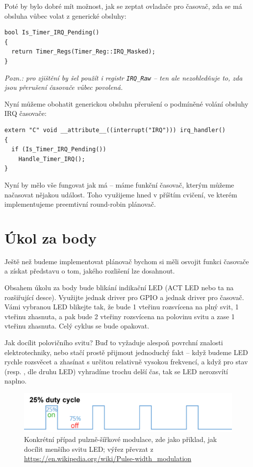 \documentclass{article}
\begin{document}
Poté by bylo dobré mít možnost, jak se zeptat ovladače pro časovač, zda se má obsluha vůbec volat z generické obsluhy:

\begin{lstlisting}
bool Is_Timer_IRQ_Pending()
{
  return Timer_Regs(Timer_Reg::IRQ_Masked);
}
\end{lstlisting}
\emph{Pozn.: pro zjištění by šel použít i registr \texttt{IRQ\_Raw} -- ten ale nezohledňuje to, zda jsou přerušení časovače vůbec povolená.}

Nyní můžeme obohatit generickou obsluhu přerušení o podmíněné volání obsluhy IRQ časovače:
\begin{lstlisting}
extern "C" void __attribute__((interrupt("IRQ"))) irq_handler()
{
  if (Is_Timer_IRQ_Pending())
    Handle_Timer_IRQ();
}
\end{lstlisting}

Nyní by mělo vše fungovat jak má -- máme funkční časovač, kterým můžeme načasovat nějakou událost. Toho využijeme hned v příštím cvičení, ve kterém implementujeme preemtivní round-robin plánovač.

\section{Úkol za body}

Ještě než budeme implementovat plánovač bychom si měli osvojit funkci časovače a získat představu o tom, jakého rozlišení lze dosahnout.

Obsahem úkolu za body bude blikání indikační LED (ACT LED nebo ta na rozšiřující desce). Využijte jednak driver pro GPIO a jednak driver pro časovač. Vámi vybranou LED blikejte tak, že bude 1 vteřinu rozsvícena na plný svit, 1 vteřinu zhasnuta, a pak bude 2 vteřiny rozsvícena na polovinu svitu a zase 1 vteřinu zhasnuta. Celý cyklus se bude opakovat.

Jak docílit polovičního svitu? Buď to vyžaduje alespoň povrchní znalosti elektrotechniky, nebo stačí prostě přijmout jednoduchý fakt -- když budeme LED rychle rozsvěcet a zhasínat s určitou relativně vysokou frekvencí, a když pro stav  (resp. , dle druhu LED) vyhradíme trochu delší čas, tak se LED nerozsvítí naplno.

\begin{figure}[ht!]
	\centering
	\includegraphics[width=\linewidth]{pwm.png}
	\caption{Konkrétní případ pulzně-šířkové modulace, zde jako příklad, jak docílit menšího svitu LED; výřez převzat z \url{https://en.wikipedia.org/wiki/Pulse-width_modulation}}
\end{figure}
\end{document}
